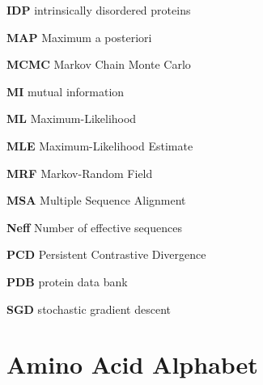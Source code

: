 \documentclass[12pt,a4paper,twoside]{book}
\theoremstyle{definition}
\theoremstyle{definition}
\theoremstyle{remark}
\begin{document}
\textbf{IDP} intrinsically disordered proteins

\textbf{MAP} Maximum a posteriori

\textbf{MCMC} Markov Chain Monte Carlo

\textbf{MI} mutual information

\textbf{ML} Maximum-Likelihood

\textbf{MLE} Maximum-Likelihood Estimate

\textbf{MRF} Markov-Random Field

\textbf{MSA} Multiple Sequence Alignment

\textbf{Neff} Number of effective sequences

\textbf{PCD} Persistent Contrastive Divergence

\textbf{PDB} protein data bank

\textbf{SGD} stochastic gradient descent

\section{Amino Acid Alphabet}\label{amino-acids}
\end{document}
